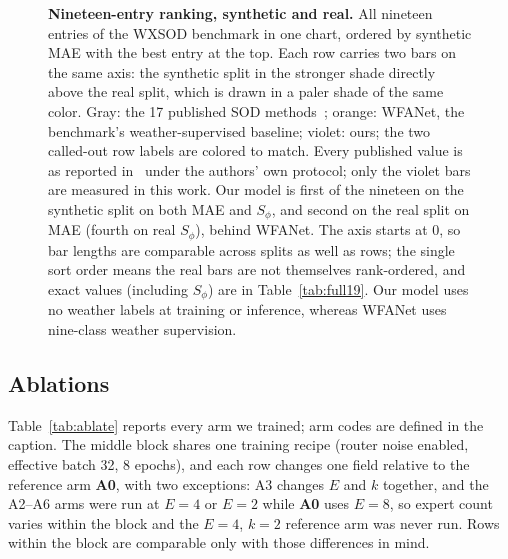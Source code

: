 \documentclass[10pt,a4paper,twocolumn,twoside]{article}
\begin{document}
\begin{figure}[!t]
\centering

\caption{\textbf{Nineteen-entry ranking, synthetic and real.}
All nineteen entries of the WXSOD benchmark in one chart, ordered by synthetic MAE with
the best entry at the top. Each row carries two bars on the same axis: the synthetic split
in the stronger shade directly above the real split, which is drawn in a paler shade of
the same color.
Gray: the 17 published SOD methods~\cite{minet,admnet,corrnet,iconet,hdnet,fsminet,a3net,aesinet,seanet,meanet,tracer,safinet,dcnet,msrmnet,gelenet,gponet,tcgnet};
orange: WFANet, the benchmark's weather-supervised baseline; violet: ours; the two
called-out row labels are colored to match.
Every published value is as reported in~\cite{wxsod2025} under the authors' own
protocol; only the violet bars are measured in this work.
Our model is first of the nineteen on the synthetic split on both MAE and $S_\phi$, and
second on the real split on MAE (fourth on real $S_\phi$), behind WFANet.
The axis starts at $0$, so bar lengths are comparable across splits as well as rows; the
single sort order means the real bars are not themselves rank-ordered, and exact values
(including $S_\phi$) are in Table~\ref{tab:full19}.
Our model uses no weather labels at training or inference, whereas WFANet uses
nine-class weather supervision.}
\label{fig:ranking}
\end{figure}

\subsection{Ablations}
\label{sec:ablations}
Table~\ref{tab:ablate} reports every arm we trained; arm codes are defined in the caption.
The middle block shares one training recipe (router noise enabled, effective batch 32,
8 epochs), and each row changes one field relative to the reference arm \textbf{A0}, with two
exceptions: A3 changes $E$ and $k$ together, and the A2--A6 arms were run at
$E{=}4$ or $E{=}2$ while \textbf{A0} uses $E{=}8$, so expert count varies within the block and
the $E{=}4$, $k{=}2$ reference arm was never run. Rows within the block are comparable only
with those differences in mind.
\end{document}
